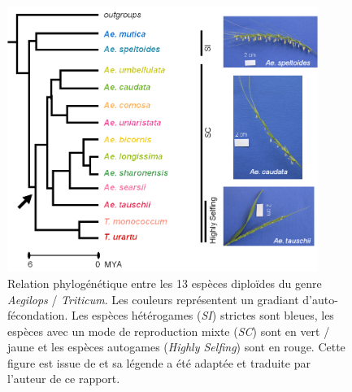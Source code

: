 \documentclass[../main]{subfiles} %
\begin{document}
\addto\extrasfrench{\protected\edef:{\unexpanded\expandafter{:}}}

\begin{figure}[ht]
    \centering
    \includegraphics[width=0.9\textwidth]{../Illustrations/phylogenetic-relationships-modified.png}
    \caption{Relation phylogénétique entre les 13 espèces diploïdes du genre \textit{Aegilops} / \textit{Triticum}. Les couleurs représentent un gradiant d'auto-fécondation. Les espèces \glspl{hétérogame} (\textit{SI}) strictes sont bleues, les espèces avec un mode de reproduction mixte (\textit{SC}) sont en vert / jaune et les espèces \glspl{autogame} (\textit{Highly Selfing}) sont en rouge. Cette figure est issue de \cite{glemin_pervasive_2019} et sa légende a été adaptée et traduite par l'auteur de ce rapport.}
    \label{fig:Phylo}
\end{figure}


\end{document}
